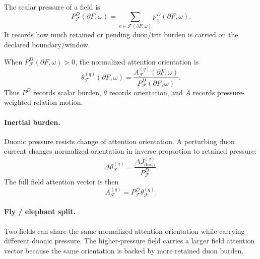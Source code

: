 \begin{definition}
The scalar pressure of a field is
\[
P^D_{\mathcal F}(\partial F,\omega)=
\sum_{e\in\mathcal F(\partial F,\omega)}p^D_e(\partial F,\omega).
\]
It records how much retained or pending duon/trit burden is carried on the declared boundary/window.
\end{definition}

When \(P^D_{\mathcal F}(\partial F,\omega)>0\), the normalized attention orientation is
\[
\theta_{\mathcal F}^{(q)}(\partial F,\omega)=
\frac{A_{\mathcal F}^{(q)}(\partial F,\omega)}{P^D_{\mathcal F}(\partial F,\omega)}.
\]
Thus \(P^D\) records scalar burden, \(\theta\) records orientation, and \(A\) records pressure-weighted relation motion.

\paragraph{Inertial burden.}
Duonic pressure resists change of attention orientation. A perturbing duon current changes normalized orientation in inverse proportion to retained pressure:
\[
\Delta\theta_{\mathcal F}^{(q)}=
\frac{\Delta J_{\mathrm{duon}}^{(q)}}{P^D_{\mathcal F}}.
\]
The full field attention vector is then
\[
A_{\mathcal F}^{(q)}=P^D_{\mathcal F}\theta_{\mathcal F}^{(q)}.
\]

\paragraph{Fly / elephant split.}
Two fields can share the same normalized attention orientation while carrying different duonic pressure. The higher-pressure field carries a larger field attention vector because the same orientation is backed by more retained duon burden.

